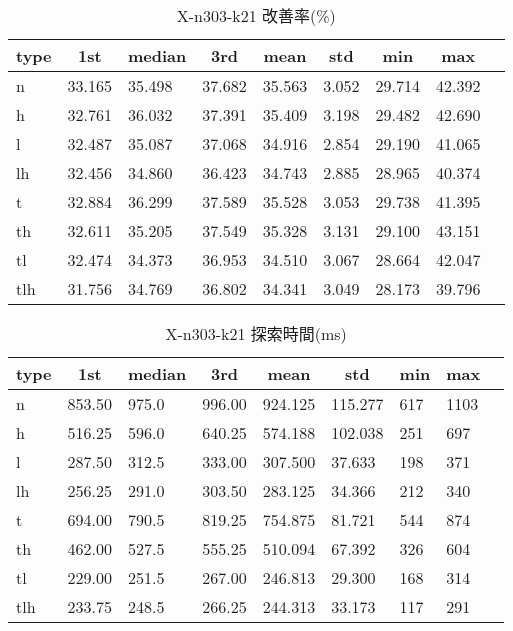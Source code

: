 \begin{table}[htbp]
    \centering
    \caption{X-n303-k21 改善率(\%)}
    \begin{tabular}{|l|l|l|l|l|l|l|l|l|}\hline
    \multicolumn{1}{|c|}{\textbf{type}}
    &\multicolumn{1}{|c|}{\textbf{1st}}
    &\multicolumn{1}{c|}{\textbf{median}}
    &\multicolumn{1}{c|}{\textbf{3rd}}
    &\multicolumn{1}{c|}{\textbf{mean}}
    &\multicolumn{1}{c|}{\textbf{std}}
    &\multicolumn{1}{c|}{\textbf{min}}
    &\multicolumn{1}{c|}{\textbf{max}}\\\hline
	n & 33.165 & 35.498 & 37.682 & 35.563 & 3.052 & 29.714 & 42.392\\\hline
	h & 32.761 & 36.032 & 37.391 & 35.409 & 3.198 & 29.482 & 42.690\\\hline
	l & 32.487 & 35.087 & 37.068 & 34.916 & 2.854 & 29.190 & 41.065\\\hline
	lh & 32.456 & 34.860 & 36.423 & 34.743 & 2.885 & 28.965 & 40.374\\\hline
	t & 32.884 & 36.299 & 37.589 & 35.528 & 3.053 & 29.738 & 41.395\\\hline
	th & 32.611 & 35.205 & 37.549 & 35.328 & 3.131 & 29.100 & 43.151\\\hline
	tl & 32.474 & 34.373 & 36.953 & 34.510 & 3.067 & 28.664 & 42.047\\\hline
	tlh & 31.756 & 34.769 & 36.802 & 34.341 & 3.049 & 28.173 & 39.796\\\hline
	\end{tabular}
\end{table}
\begin{table}[htbp]
    \centering
    \caption{X-n303-k21 探索時間(ms)}
    \begin{tabular}{|l|l|l|l|l|l|l|l|l|}\hline
    \multicolumn{1}{|c|}{\textbf{type}}
    &\multicolumn{1}{|c|}{\textbf{1st}}
    &\multicolumn{1}{c|}{\textbf{median}}
    &\multicolumn{1}{c|}{\textbf{3rd}}
    &\multicolumn{1}{c|}{\textbf{mean}}
    &\multicolumn{1}{c|}{\textbf{std}}
    &\multicolumn{1}{c|}{\textbf{min}}
    &\multicolumn{1}{c|}{\textbf{max}}\\\hline
	n & 853.50 & 975.0 & 996.00 & 924.125 & 115.277 & 617 & 1103\\\hline
	h & 516.25 & 596.0 & 640.25 & 574.188 & 102.038 & 251 & 697\\\hline
	l & 287.50 & 312.5 & 333.00 & 307.500 & 37.633 & 198 & 371\\\hline
	lh & 256.25 & 291.0 & 303.50 & 283.125 & 34.366 & 212 & 340\\\hline
	t & 694.00 & 790.5 & 819.25 & 754.875 & 81.721 & 544 & 874\\\hline
	th & 462.00 & 527.5 & 555.25 & 510.094 & 67.392 & 326 & 604\\\hline
	tl & 229.00 & 251.5 & 267.00 & 246.813 & 29.300 & 168 & 314\\\hline
	tlh & 233.75 & 248.5 & 266.25 & 244.313 & 33.173 & 117 & 291\\\hline
	\end{tabular}
\end{table}
